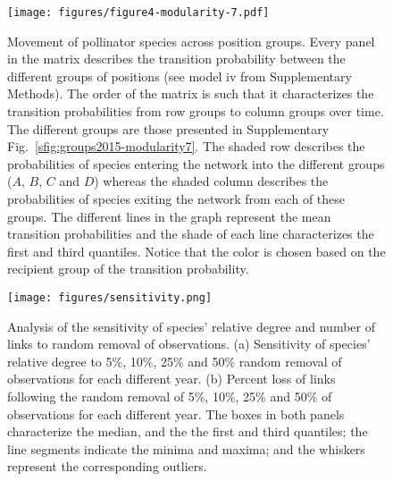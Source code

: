 \documentclass[11pt, a4paper]{article}
\begin{document}
\clearpage

\begin{figure}[p]
  \centering
    \vspace{0.5cm}
    \texttt{[image: figures/figure4-modularity-7.pdf]}
	  \vspace{0.5cm}
	   \caption[Movement of pollinator species across position groups]{Movement of pollinator species across position groups. Every panel in the matrix describes the transition probability between the different groups of positions (see model iv from Supplementary Methods). The order of the matrix is such that it characterizes the transition probabilities from row groups to column groups over time. The different groups are those presented in Supplementary Fig.~\ref{sfig:groups2015-modularity7}. The shaded row describes the probabilities of species entering the network into the different groups ($A$, $B$, $C$ and $D$) whereas the shaded column describes the probabilities of species exiting the network from each of these groups. The different lines in the graph represent the mean transition probabilities and the shade of each line characterizes the first and third quantiles. Notice that the color is chosen based on the recipient group of the transition probability.}
      \label{sfig:dynamics-modularity7}
\end{figure}

\clearpage

\begin{figure}[ht]
  \centering
    \vspace{0.5cm}
    \texttt{[image: figures/sensitivity.png]}
    	  \vspace{0.3cm}
	   \caption{Analysis of the sensitivity of species' relative degree and number of links to random removal of observations. (a) Sensitivity of species' relative degree to 5\%, 10\%, 25\% and 50\% random removal of observations for each different year. (b) Percent loss of links following the random removal of 5\%, 10\%, 25\% and 50\% of observations for each different year. The boxes in both panels characterize the median, and the the first and third quantiles; the line segments indicate the minima and maxima; and the whiskers represent the corresponding outliers.}
      \label{sfig:sensitivity}
\end{figure}

\clearpage
\end{document}
